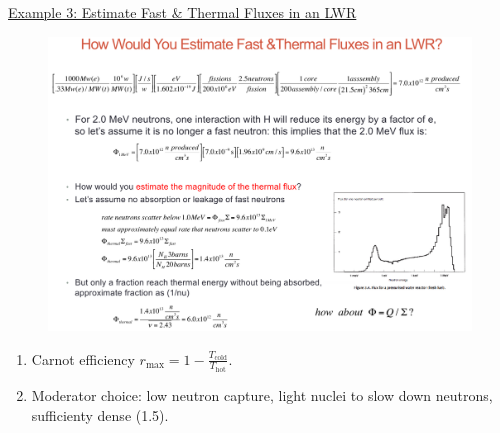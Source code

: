 \documentclass{school-22.211-notes}
\begin{document}
\uline{Example 3: Estimate Fast \& Thermal Fluxes in an LWR}
\begin{figure}[ht]
  \centering
  \includegraphics[width=4.5in]{images/intro/lec1-example3.png}
\end{figure}

\clearpage
\begin{enumerate}
\item Carnot efficiency $r_{\mathrm{max}} = 1 - \frac{T_{\mathrm{cold}}}{T_{\mathrm{hot}}}$. 
\item Moderator choice: low neutron capture, light nuclei to slow down neutrons, sufficienty dense (1.5). 
\end{enumerate}
\end{document}
